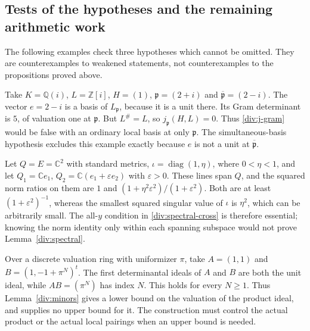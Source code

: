 

\subsection{Tests of the hypotheses and the remaining arithmetic work}

The following examples check three hypotheses which cannot be omitted.
They are counterexamples to weakened statements, not counterexamples
to the propositions proved above.

\begin{example}
Take $K=\mathbb Q(i)$, $L=\mathbb Z[i]$, $H=(1)$,
$\mathfrak p=(2+i)$ and $\overline{\mathfrak p}=(2-i)$.
The vector $e=2-i$ is a basis of $L_{\mathfrak p}$, because it is a unit
there. Its Gram determinant is $5$, of valuation one at $\mathfrak p$.
But $L^\#=L$, so $j_{\mathfrak p}(H,L)=0$.
Thus \eqref{div:j-gram} would be false with an ordinary local basis at
only $\mathfrak p$. The simultaneous-basis hypothesis excludes this
example exactly because $e$ is not a unit at
$\overline{\mathfrak p}$.
\end{example}

\begin{example}
Let $Q=E=\mathbb C^2$ with standard metrics,
$\iota=\operatorname{diag}(1,\eta)$, where $0<\eta<1$, and let
$Q_1=\mathbb Ce_1$, $Q_2=\mathbb C(e_1+\varepsilon e_2)$ with
$\varepsilon>0$. These lines span $Q$, and the squared norm ratios
on them are $1$ and $(1+\eta^2\varepsilon^2)/(1+\varepsilon^2)$.
Both are at least $(1+\varepsilon^2)^{-1}$, whereas the smallest
squared singular value of $\iota$ is $\eta^2$, which can be arbitrarily
small. The all-$y$ condition in \eqref{div:spectral-cross} is therefore
essential; knowing the norm identity only within each spanning
subspace would not prove Lemma~\ref{div:spectral}.
\end{example}

\begin{example}
Over a discrete valuation ring with uniformizer $\pi$, take
$A=(1,1)$ and $B=(1,-1+\pi^N)^t$. The first determinantal ideals of
$A$ and $B$ are both the unit ideal, while $AB=(\pi^N)$ has index
$N$. This holds for every $N\ge1$.
Thus Lemma~\ref{div:minors} gives a lower bound on the valuation of
the product ideal, and supplies no upper bound for it. The construction
must control the actual product or the actual local pairings when an
upper bound is needed.
\end{example}

